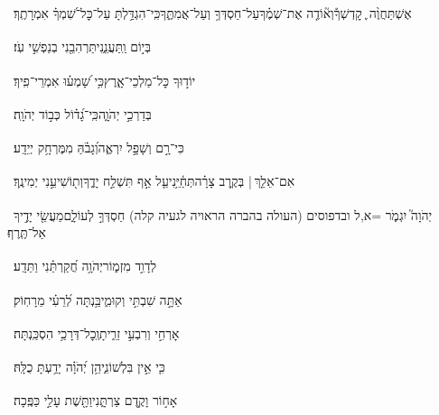\documentclass[12pt]{article}
\newcommand{\loc}[1]{\textsuperscript{\locf{#1}}}
\begin{document}
{\loc{ ב}~}‏אֶשְׁתַּחֲוֶ֨ה ֪ קׇדְשְׁךָ֡{\hfill}וְא֘וֹדֶ֤ה אֶת־שְׁמֶ֗ךָ\newline\hspace*{.5em}עַל־חַסְדְּךָ֥ וְעַל־אֲמִתֶּ֑ךָ{\hfill}כִּֽי־הִגְדַּ֥לְתָּ עַל־כׇּל־שִׁ֝מְךָ֗ אִמְרָתֶֽךָ׃\par

{\loc{ ג}~}‏בְּי֣וֹם  וַֽתַּעֲנֵ֑נִי{\hfill}תַּרְהִבֵ֖נִי בְנַפְשִׁ֣י עֹֽז׃\par

{\loc{ ד}~}‏יוֹד֣וּךָ  כׇּל־מַלְכֵי־אָ֑רֶץ{\hfill}כִּ֥י שָׁ֝מְע֗וּ אִמְרֵי־פִֽיךָ׃\par

{\loc{ ה}~}‏ בְּדַרְכֵ֣י יְהֹוָ֑ה{\hfill}כִּֽי־גָ֝ד֗וֹל כְּב֣וֹד יְהֹוָֽה׃\par

{\loc{ ו}~}‏כִּי־רָ֣ם  וְשָׁפָ֣ל יִרְאֶ֑ה{\hfill}וְ֝גָבֹ֗הַּ מִמֶּרְחָ֥ק יְיֵדָֽע׃\par

{\loc{ ז}~}‏אִם־אֵלֵ֤ךְ |  בְּקֶ֥רֶב צָרָ֗ה{\hfill}תְּחַ֫יֵּ֥נִי\newline\hspace*{.5em}עַ֤ל אַ֣ף  תִּשְׁלַ֣ח יָדֶ֑ךָ{\hfill}וְת֖וֹשִׁיעֵ֣נִי יְמִינֶֽךָ׃\par

{\loc{ ח}~}‏יְהֹוָה֮ יִגְמֹ֢ר =א,ל ובדפוסים (העולה בהברה הראויה לגעיה קלה){\hfill} חַסְדְּךָ֣ לְעוֹלָ֑ם\newline\hspace*{.5em}מַעֲשֵׂ֖י יָדֶ֣יךָ אַל־תֶּֽרֶף׃\par\pend
\ledpb
\pstart[\subsection*{\textcolor{red}{פרק קלט}}]\label{פרק קלט}
{\loc{ א}~}‏ לְדָוִ֣ד מִזְמ֑וֹר\newline\hspace*{.5em}יְהֹוָ֥ה חֲ֝קַרְתַּ֗נִי וַתֵּדָֽע׃\par

{\loc{ ב}~}‏אַתָּ֣ה  שִׁבְתִּ֣י וְקוּמִ֑י{\hfill}בַּ֥נְתָּה לְ֝רֵעִ֗י מֵרָחֽוֹק׃\par

{\loc{ ג}~}‏אׇרְחִ֣י וְרִבְעִ֣י זֵרִ֑יתָ{\hfill}וְֽכׇל־דְּרָכַ֥י הִסְכַּֽנְתָּה׃\par

{\loc{ ד}~}‏כִּ֤י אֵ֣ין  בִּלְשׁוֹנִ֑י{\hfill}הֵ֥ן יְ֝הֹוָ֗ה יָדַ֥עְתָּ כֻלָּֽהּ׃\par

{\loc{ ה}~}‏אָח֣וֹר וָקֶ֣דֶם צַרְתָּ֑נִי{\hfill}וַתָּ֖שֶׁת עָלַ֣י כַּפֶּֽכָה׃\par
\end{document}
